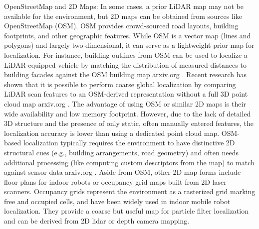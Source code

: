     OpenStreetMap and 2D Maps: In some cases, a prior LiDAR map may not be available for the environment, but 2D maps can be obtained from sources like OpenStreetMap (OSM). OSM provides crowd-sourced road layouts, building footprints, and other geographic features. While OSM is a vector map (lines and polygons) and largely two-dimensional, it can serve as a lightweight prior map for localization. For instance, building outlines from OSM can be used to localize a LiDAR-equipped vehicle by matching the distribution of measured distances to building facades against the OSM building map​
    arxiv.org
    . Recent research has shown that it is possible to perform coarse global localization by comparing LiDAR scan features to an OSM-derived representation without a full 3D point cloud map​
    arxiv.org
    . The advantage of using OSM or similar 2D maps is their wide availability and low memory footprint. However, due to the lack of detailed 3D structure and the presence of only static, often manually entered features, the localization accuracy is lower than using a dedicated point cloud map. OSM-based localization typically requires the environment to have distinctive 2D structural cues (e.g., building arrangements, road geometry) and often needs additional processing (like computing custom descriptors from the map) to match against sensor data​
    arxiv.org
    . Aside from OSM, other 2D map forms include floor plans for indoor robots or occupancy grid maps built from 2D laser scanners. Occupancy grids represent the environment as a rasterized grid marking free and occupied cells, and have been widely used in indoor mobile robot localization. They provide a coarse but useful map for particle filter localization and can be derived from 2D lidar or depth camera mapping.

